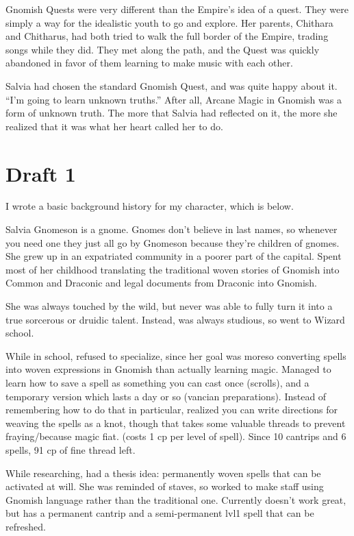 \documentclass[12pt]{article}[titlepage]
\newcommand{\say}[1]{``#1''}
\renewcommand{\,}{\textsuperscript{,}}
\begin{document}
Gnomish Quests were very different than the Empire's idea of a quest.
They were simply a way for the idealistic youth to go and explore.
Her parents, Chithara and Chitharus, had both tried to walk the full border of the Empire, trading songs while they did.
They met along the path, and the Quest was quickly abandoned in favor of them learning to make music with each other.

Salvia had chosen the standard Gnomish Quest, and was quite happy about it.
\say{I'm going to learn unknown truths.}
After all, Arcane Magic in Gnomish was a form of unknown truth.
The more that Salvia had reflected on it, the more she realized that it was what her heart called her to do.


\section{Draft 1}
I wrote a basic background history for my character, which is below.

Salvia Gnomeson is a gnome.
Gnomes don't believe in last names, so whenever you need one they just all go by Gnomeson because they're children of gnomes.
She grew up in an expatriated community in a poorer part of the capital.
Spent most of her childhood translating the traditional woven stories of Gnomish into Common and Draconic and legal documents from Draconic into Gnomish.

She was always touched by the wild, but never was able to fully turn it into a true sorcerous or druidic talent.
Instead, was always studious, so went to Wizard school.

While in school, refused to specialize, since her goal was moreso converting spells into woven expressions in Gnomish than actually learning magic.
Managed to learn how to save a spell as something you can cast once (scrolls), and a temporary version which lasts a day or so (vancian preparations).
Instead of remembering how to do that in particular, realized you can write directions for weaving the spells as a knot, though that takes some valuable threads to prevent fraying/because magic fiat. (costs 1 cp per level of spell).
Since 10 cantrips and 6 spells, 91 cp of fine thread left.

While researching, had a thesis idea: permanently woven spells that can be activated at will.
She was reminded of staves, so worked to make staff using Gnomish language rather than the traditional one.
Currently doesn't work great, but has a permanent cantrip and a semi-permanent lvl1 spell that can be refreshed.
\end{document}
